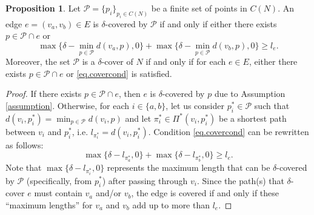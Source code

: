 \documentclass[review]{elsarticle}
\newcommand{\cP}{{\mathcal P}}
\newcommand{\dlt}{{\delta}}
\theoremstyle{definition}
\newtheorem{proposition}{Proposition}[section]
\begin{document}
 \begin{proposition}
 \label{thm.cover}
Let $\cP=\{p_i\}_{p_i\in C(N)}$ be a finite set  of points in $C(N)$. An edge $e=(v_a, v_b) \in E$ is $\dlt$-covered by $\cP$ if and only if either there exists $p \in \cP\cap e$ or
 \begin{equation}
	\label{eq.covercond}
    	\max\{\dlt -  \min_{p \in \cP} d(v_a,p),0\} +  \max \{\dlt - \min_{p \in \cP} d(v_b,p), 0 \} \ge l_e.
	\end{equation}
Moreover, the set $\cP$ is a $\dlt$-cover of $N$ if and only if for each $e\in E$, either there exists $p \in \cP\cap e$ or \eqref{eq.covercond} is satisfied.
\end{proposition}
\begin{proof}  
If there exists $p\in \cP\cap e$, then $e$ is $\dlt$-covered by $p$ due to Assumption \ref{assumption}.
Otherwise, for each $i\in\{a,b\}$, let us consider $p^*_i \in \cP$ such that $d(v_i,p^*_i)=\min_{p \in \cP} d(v_i,p)$ and let  $\pi^*_i\in \Pi^*(v_i,p_i^*)$ be a shortest path between $v_i$ and $p_i^*$, i.e. $l_{\pi^*_i}= d(v_i,p^*_i)$. Condition \eqref{eq.covercond} can be rewritten as follows:
$$ \max\{\dlt - l_{\pi^*_a},0\} +  \max \{\dlt - l_{\pi^*_b}, 0 \} \ge l_e.$$
Note that $\max\{\dlt - l_{\pi^*_i},0\} $ represents the maximum length that can be $\dlt$-covered by $\cP$ (specifically, from $p^*_i$) after passing through $v_i$. Since the path(s) that $\dlt$-cover $e$ must contain $v_a$ and/or $v_b$, the edge is covered if and only if these ``maximum lengths'' for $v_a$ and $v_b$ add up to more than $l_e$.



\end{proof}
\end{document}
